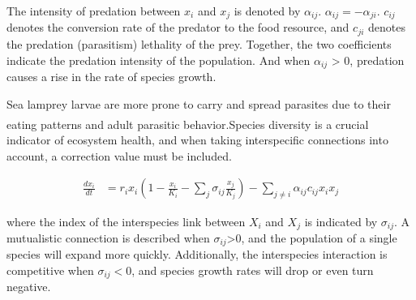 \documentclass[12pt]{article}  %
\newcommand{\upcite}[1]{\textsuperscript{\textsuperscript{\cite{#1}}}}
\begin{document}
The intensity of predation between ${x_i}$ and ${x_j}$ is denoted by $\alpha_{ij}$. $\alpha_{ij} = -\alpha_{ji}$. $c_{ij}$ denotes the conversion rate of the predator to the food resource, and $c_{ji}$ denotes the predation (parasitism) lethality of the prey. Together, the two coefficients indicate the predation intensity of the population. And when $\alpha_{ij}$ > 0, predation causes a rise in the rate of species growth. \par
Sea lamprey larvae are more prone to carry and spread parasites due to their eating patterns and adult parasitic behavior\upcite{2}.Species diversity is a crucial indicator of ecosystem health, and when taking interspecific connections into account, a correction value must be included.


\begin{equation}
	\begin{aligned}
		\frac{dx_i}{dt} &= r_i x_i \left(1 - \frac{x_i}{K_i} - \sum_{j}\sigma_{ij}\frac{x_j}{K_j}\right) - \sum_{j \neq i} \alpha_{ij} c_{ij} x_i x_j
	\end{aligned}
\end{equation}
\par

where the index of the interspecies link between $X_i$ and $X_j$ is indicated by $\sigma_{ij}$.  A mutualistic connection is described when $\sigma_{ij}$>0, and the population of a single species will expand more quickly. Additionally, the interspecies interaction is competitive when $\sigma_{ij}<0$, and species growth rates will drop or even turn negative.
\par
\end{document}
